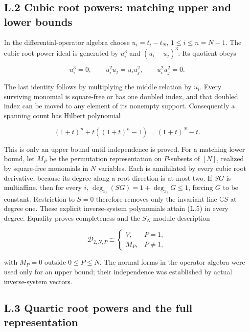 \hypertarget{l.2-cubic-root-powers-matching-upper-and-lower-bounds}{%
\subsection{L.2 Cubic root powers: matching upper and lower bounds}\label{l.2-cubic-root-powers-matching-upper-and-lower-bounds}}

In the differential-operator algebra choose \(u_i=t_i-t_N\), \(1\le i\le n=N-1\). The cubic root-power ideal is generated by \(u_i^3\) and \((u_i-u_j)^3\). Its quotient obeys

\[
u_i^3=0,\qquad u_i^2u_j=u_iu_j^2,\qquad u_i^2u_j^2=0.
\tag{L.4}
\]

The last identity follows by multiplying the middle relation by \(u_i\). Every surviving monomial is square-free or has one doubled index, and that doubled index can be moved to any element of its nonempty support. Consequently a spanning count has Hilbert polynomial

\[
(1+t)^n+t((1+t)^n-1)=(1+t)^N-t.
\tag{L.5}
\]

This is only an upper bound until independence is proved. For a matching lower bound, let \(M_P\) be the permutation representation on \(P\)-subsets of \([N]\), realized by square-free monomials in \(N\) variables. Each is annihilated by every cubic root derivative, because its degree along a root direction is at most two. If \(SG\) is multiaffine, then for every \(i\), \(\deg_{x_i}(SG)=1+\deg_{x_i}G\le1\), forcing \(G\) to be constant. Restriction to \(S=0\) therefore removes only the invariant line \(\mathbb C S\) at degree one. These explicit inverse-system polynomials attain (L.5) in every degree. Equality proves completeness and the \(S_N\)-module description

\[
\mathscr D_{2,N,P}\cong
\begin{cases}V,&P=1,\\M_P,&P\ne1,\end{cases}
\tag{L.6}
\]

with \(M_P=0\) outside \(0\le P\le N\). The normal forms in the operator algebra were used only for an upper bound; their independence was established by actual inverse-system vectors.

\hypertarget{l.3-quartic-root-powers-and-the-full-representation}{%
\subsection{L.3 Quartic root powers and the full representation}\label{l.3-quartic-root-powers-and-the-full-representation}}

